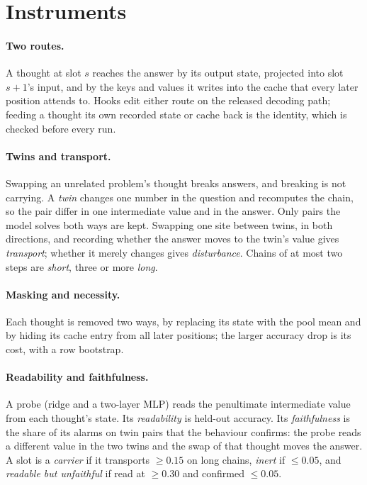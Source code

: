 \documentclass{article}
\begin{document}
\section{Instruments}\label{sec:instruments}

\paragraph{Two routes.} A thought at slot $s$ reaches the answer by its output state, projected into slot $s{+}1$'s input, and by the keys and values it writes into the cache that every later position attends to. Hooks edit either route on the released decoding path; feeding a thought its own recorded state or cache back is the identity, which is checked before every run.

\paragraph{Twins and transport.} Swapping an unrelated problem's thought breaks answers, and breaking is not carrying. A \emph{twin} changes one number in the question and recomputes the chain, so the pair differ in one intermediate value and in the answer. Only pairs the model solves both ways are kept. Swapping one site between twins, in both directions, and recording whether the answer moves to the twin's value gives \emph{transport}; whether it merely changes gives \emph{disturbance}. Chains of at most two steps are \emph{short}, three or more \emph{long}.

\paragraph{Masking and necessity.} Each thought is removed two ways, by replacing its state with the pool mean and by hiding its cache entry from all later positions; the larger accuracy drop is its cost, with a row bootstrap.

\paragraph{Readability and faithfulness.} A probe (ridge and a two-layer MLP) reads the penultimate intermediate value from each thought's state. Its \emph{readability} is held-out accuracy. Its \emph{faithfulness} is the share of its alarms on twin pairs that the behaviour confirms: the probe reads a different value in the two twins and the swap of that thought moves the answer. A slot is a \emph{carrier} if it transports $\ge 0.15$ on long chains, \emph{inert} if $\le 0.05$, and \emph{readable but unfaithful} if read at $\ge 0.30$ and confirmed $\le 0.05$.
\end{document}
